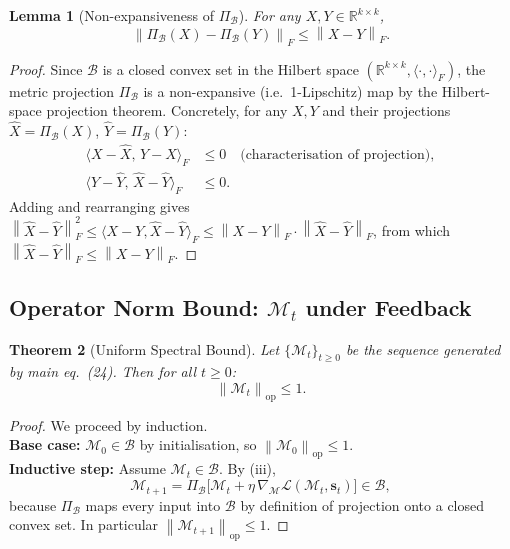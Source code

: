 \documentclass[12pt,letterpaper]{article}
\theoremstyle{plain}
\newtheorem{theorem}{Theorem}[section]
\newtheorem{lemma}[theorem]{Lemma}
\theoremstyle{definition}
\newcommand{\M}{\mathcal{M}}
\newcommand{\calB}{\mathcal{B}}
\newcommand{\calL}{\mathcal{L}}
\newcommand{\opnorm}[1]{\left\|#1\right\|_{\mathrm{op}}}
\newcommand{\frnorm}[1]{\left\|#1\right\|_{F}}
\newcommand{\R}{\mathbb{R}}
\begin{document}
\begin{lemma}[Non-expansiveness of \(\Pi_{\calB}\)]
\label{lem:nonexpansive}
For any \(X, Y \in \R^{k\times k}\),
\[
  \frnorm{\Pi_{\calB}(X) - \Pi_{\calB}(Y)} \leq \frnorm{X - Y}.
\]
\end{lemma}

\begin{proof}
Since \(\calB\) is a closed convex set in the Hilbert space
\((\R^{k\times k}, \langle\cdot,\cdot\rangle_F)\), the metric projection
\(\Pi_{\calB}\) is a non-expansive (i.e.\ 1-Lipschitz) map by the
Hilbert-space projection theorem.
Concretely, for any \(X, Y\) and their projections
\(\hat X = \Pi_{\calB}(X)\), \(\hat Y = \Pi_{\calB}(Y)\):
\begin{align*}
  \langle X - \hat X,\, \hat Y - \hat X \rangle_F &\leq 0
    \quad\text{(characterisation of projection)}, \\
  \langle Y - \hat Y,\, \hat X - \hat Y \rangle_F &\leq 0.
\end{align*}
Adding and rearranging gives
\(\frnorm{\hat X - \hat Y}^2 \leq \langle X - Y, \hat X - \hat Y\rangle_F
\leq \frnorm{X-Y}\cdot\frnorm{\hat X - \hat Y}\),
from which \(\frnorm{\hat X - \hat Y} \leq \frnorm{X-Y}\).
\end{proof}

\subsection{Operator Norm Bound: \(\M_t\) under Feedback}

\begin{theorem}[Uniform Spectral Bound]
\label{thm:spectral_bound}
Let \(\{\M_t\}_{t\geq 0}\) be the sequence generated by main eq.~(24).
Then for all \(t \geq 0\):
\[
  \opnorm{\M_t} \leq 1.
\]
\end{theorem}

\begin{proof}
We proceed by induction.\\
\textbf{Base case:} \(\M_0 \in \calB\) by initialisation, so
\(\opnorm{\M_0} \leq 1\).\\
\textbf{Inductive step:} Assume \(\M_t \in \calB\).  By
(iii),
\[
  \M_{t+1} = \Pi_{\calB}\!\bigl[\M_t + \eta\,\nabla_{\!\M}\calL(\M_t,
    \mathbf{s}_t)\bigr] \in \calB,
\]
because \(\Pi_{\calB}\) maps every input into \(\calB\) by definition of
projection onto a closed convex set.  In particular
\(\opnorm{\M_{t+1}} \leq 1\).
\end{proof}
\end{document}
